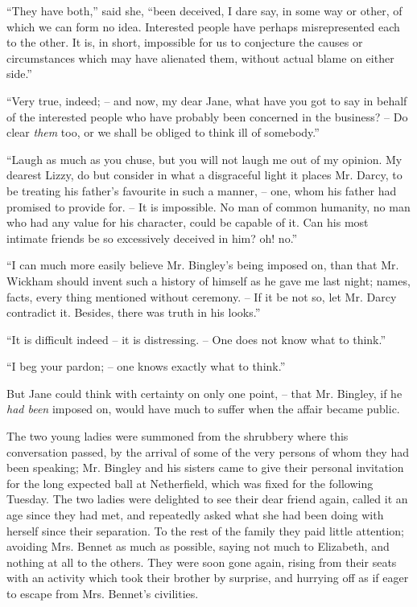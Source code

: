 “They have both,” said she, “been deceived, I dare
say, in some way or other, of which we can form no idea.
Interested people have perhaps misrepresented each to
the other. It is, in short, impossible for us to conjecture
the causes or circumstances which may have alienated
them, without actual blame on either side.”

“Very true, indeed; -- and now, my dear Jane, what
have you got to say in behalf of the interested people
who have probably been concerned in the business? -- Do
clear \textit{them} too, or we shall be obliged to think ill of
somebody.”

“Laugh as much as you chuse, but you will not laugh
me out of my opinion. My dearest Lizzy, do but consider
in what a disgraceful light it places Mr. Darcy, to be
treating his father’s favourite in such a manner, -- one,
whom his father had promised to provide for. -- It is impossible.
No man of common humanity, no man who had
any value for his character, could be capable of it. Can
his most intimate friends be so excessively deceived in
him? oh! no.”

“I can much more easily believe Mr. Bingley’s being
imposed on, than that Mr. Wickham should invent such
a history of himself as he gave me last night; names,
facts, every thing mentioned without ceremony. -- If it be
not so, let Mr. Darcy contradict it. Besides, there was
truth in his looks.”

“It is difficult indeed -- it is distressing. -- One does not
know what to think.”

“I beg your pardon; -- one knows exactly what to
think.”

But Jane could think with certainty on only one
point, -- that Mr. Bingley, if he \textit{had been} imposed on,
would have much to suffer when the affair became public.

The two young ladies were summoned from the shrubbery
where this conversation passed, by the arrival of
some of the very persons of whom they had been speaking;
Mr. Bingley and his sisters came to give their personal
invitation for the long expected ball at Netherfield, which
was fixed for the following Tuesday. The two ladies were
delighted to see their dear friend again, called it an age
since they had met, and repeatedly asked what she had
been doing with herself since their separation. To the rest
of the family they paid little attention; avoiding Mrs.
Bennet as much as possible, saying not much to Elizabeth,
and nothing at all to the others. They were soon gone
again, rising from their seats with an activity which took
their brother by surprise, and hurrying off as if eager
to escape from Mrs. Bennet’s civilities.

